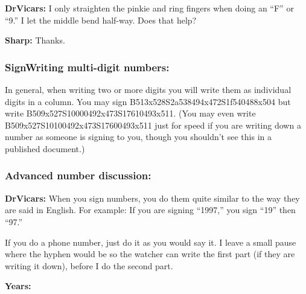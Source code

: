 \documentclass{article}
\begin{document}
\textbf{DrVicars:}
I only straighten the pinkie and ring fingers when doing an ``F'' or ``9.''
I let the middle bend half-way.
Does that help?

\textbf{Sharp:}
Thanks.

\subsubsection{SignWriting multi-digit numbers:}

In general, when writing two or more digits you will write them as individual digits in a column.
You may sign B513x528S2a538494x472S1f540488x504 but write B509x527S10000492x473S17610493x511.
(You may even write B509x527S10100492x473S17600493x511 just for speed if you are writing down a number as someone is signing to you, though you shouldn't see this in a published document.)

\subsubsection{Advanced number discussion:}

\textbf{DrVicars:}
When you sign numbers, you do them quite similar to the way they are said in English.
For example:
If you are signing ``1997,'' you sign ``19'' then ``97.''

If you do a phone number, just do it as you would say it.
I leave a small pause where the hyphen would be so the watcher can write the first part (if they are writing it down), before I do the second part.

\textbf{Years:}
\end{document}
